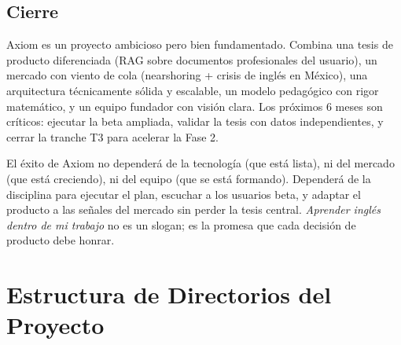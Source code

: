 \documentclass[10pt,a4paper,oneside]{report}
\begin{document}
\section{Cierre}
Axiom es un proyecto ambicioso pero bien fundamentado. Combina una tesis de producto diferenciada (RAG sobre documentos profesionales del usuario), un mercado con viento de cola (nearshoring + crisis de inglés en México), una arquitectura técnicamente sólida y escalable, un modelo pedagógico con rigor matemático, y un equipo fundador con visión clara. Los próximos 6 meses son críticos: ejecutar la beta ampliada, validar la tesis con datos independientes, y cerrar la tranche T3 para acelerar la Fase 2.

\begin{tcolorbox}[infobox,title=Mensaje final]
El éxito de Axiom no dependerá de la tecnología (que está lista), ni del mercado (que está creciendo), ni del equipo (que se está formando). Dependerá de la disciplina para ejecutar el plan, escuchar a los usuarios beta, y adaptar el producto a las señales del mercado sin perder la tesis central. \textit{Aprender inglés dentro de mi trabajo} no es un slogan; es la promesa que cada decisión de producto debe honrar.
\end{tcolorbox}

\appendix

\chapter{Estructura de Directorios del Proyecto}
\end{document}
